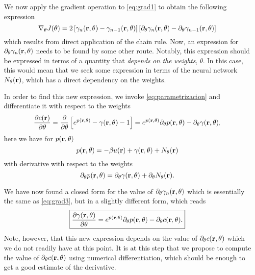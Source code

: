 We now apply the gradient operation to \autoref{eq:grad1} to obtain the following
expression
\begin{equation}
    \nabla_{\theta} J(\theta) = 2 \left[\gamma_{n}(\mathbf{r}, \theta) - \gamma_{n-1}(\mathbf{r}, \theta) \right]
    \left[ \partial_{\theta} \gamma_{n}(\mathbf{r}, \theta) - \partial_{\theta} \gamma_{n-1}(\mathbf{r}, \theta) \right]
    \label{eq:grad2}
\end{equation}
which results from direct application of the chain rule. Now, an expression for
$\partial_{\theta} \gamma_{n}(\mathbf{r}, \theta)$ needs to
be found by some other route. Notably, this expression should be expressed in terms
of a quantity that \emph{depends on the weights}, $\theta$. In this case, 
this would mean that we seek some expression in terms of the neural
network $N_{\theta}(\mathbf{r})$, which has a direct dependency on the weights.

In order to find this new expression, we invoke \autoref{eq:parametrizacion} and
differentiate it with respect to the weights
\begin{equation}
    \frac{\partial c(\mathbf{r})}{\partial \theta} = \frac{\partial}{\partial \theta}
    \left[ e^{p(\mathbf{r}, \theta)} - \gamma(\mathbf{r}, \theta) - 1 \right] =
    e^{p(\mathbf{r}, \theta)} \partial_{\theta} p(\mathbf{r}, \theta) - \partial_{\theta} \gamma(\mathbf{r}, \theta)
    ,
    \label{eq:grad3}
\end{equation}
here we have for $p(\mathbf{r}, \theta)$
\begin{equation}
    p(\mathbf{r}, \theta) = -\beta u(\mathbf{r}) + \gamma(\mathbf{r}, \theta) + N_{\theta}(\mathbf{r})
    \label{eq:pr}    
\end{equation}
with derivative with respect to the weights
\begin{equation}
    \partial_{\theta} p(\mathbf{r}, \theta) = \partial_{\theta} \gamma(\mathbf{r}, \theta) + \partial_{\theta} N_{\theta}(\mathbf{r})
    .
    \label{eq:grad-pr}
\end{equation}

We have now found a closed form for the value of
$\partial_{\theta} \gamma_{n}(\mathbf{r}, \theta)$
which is essentially the same as \autoref{eq:grad3}, but in a slightly different form,
which reads
\begin{equation}
    \boxed{
    \frac{\partial \gamma(\mathbf{r}, \theta)}{\partial \theta} =
    e^{p(\mathbf{r}, \theta)} \partial_{\theta} p(\mathbf{r}, \theta) - \partial_{\theta} c(\mathbf{r}, \theta)
    .
    }
    \label{eq:grad4}
\end{equation}
Note, however, that this new expression depends on the value of
$\partial_{\theta} c(\mathbf{r}, \theta)$
which we do not readily have at this point. It is at this step that we propose
to compute the value of $\partial_{\theta} c(\mathbf{r}, \theta)$ using numerical
differentiation, which should be enough to get a good estimate of the derivative.

